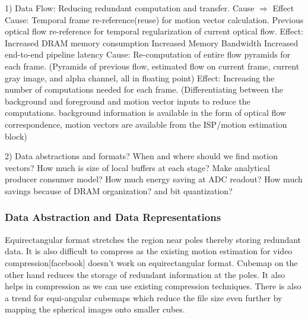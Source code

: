 1)  Data Flow: Reducing redundant computation and transfer.\newline
Cause $\Rightarrow$ Effect  \newline
Cause:\newline
Temporal frame re-reference(reuse) for motion vector calculation.\newline
Previous optical flow re-reference for temporal regularization of current optical flow.\newline
Effect: \newline
Increased DRAM memory consumption \newline
Increased Memory Bandwidth \newline
Increased end-to-end pipeline latency \newline
Cause: \newline
Re-computation of entire flow pyramids for each frame. (Pyramids of previous flow, estimated flow on current frame, current gray image, and alpha channel, all in floating point)\newline
Effect:\newline
Increasing the number of computations needed for each frame. \newline
(Differentiating between the background and foreground and motion vector inputs to reduce the computations. background information is available in the form of optical flow correspondence, motion vectors are available from the ISP/motion estimation block)\newline

2)  Data abstractions and formats?
When and where should we find motion vectors?
How much is size of local buffers at each stage? Make analytical producer consumer model?
How much energy saving at ADC readout?
How much savings because of DRAM organization? and bit quantization?

\subsubsection{Data Abstraction and Data Representations}
Equirectangular format stretches the region near poles thereby storing redundant data. It is also difficult to compress as the existing motion estimation for video compression[facebook] doesn't work on equirectangular format. Cubemap on the other hand reduces the storage of redundant information at the poles. It also helps in compression as we can use existing compression techniques. There is also a trend for equi-angular cubemaps which reduce the file size even further by mapping the spherical images onto smaller cubes.\newline

